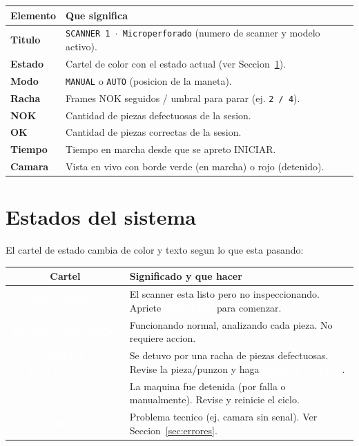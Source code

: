 \documentclass[11pt,a4paper]{article}
\newcommand{\btn}[1]{\colorbox{ink}{\textcolor{white}{\small\,\textbf{#1}\,}}}
\newcommand{\estado}[2]{\colorbox{#1}{\textcolor{white}{\small\,\textbf{#2}\,}}}
\begin{document}
\begin{center}
\renewcommand{\arraystretch}{1.35}
\begin{tabular}{>{\raggedright\arraybackslash}p{4.6cm} p{10.2cm}}
\toprule
\textbf{Elemento} & \textbf{Que significa}\\
\midrule
\textbf{Titulo} & \texttt{SCANNER 1 $\cdot$ Microperforado} (numero de scanner y modelo activo).\\
\textbf{Estado} & Cartel de color con el estado actual (ver Seccion~\ref{sec:estados}).\\
\textbf{Modo} & \texttt{MANUAL} o \texttt{AUTO} (posicion de la maneta).\\
\textbf{Racha} & Frames NOK seguidos / umbral para parar (ej. \texttt{2 / 4}).\\
\textbf{NOK} & Cantidad de piezas defectuosas de la sesion.\\
\textbf{OK} & Cantidad de piezas correctas de la sesion.\\
\textbf{Tiempo} & Tiempo en marcha desde que se apreto INICIAR.\\
\textbf{Camara} & Vista en vivo con borde verde (en marcha) o rojo (detenido).\\
\bottomrule
\end{tabular}
\end{center}

\section{Estados del sistema}\label{sec:estados}
El cartel de estado cambia de color y texto segun lo que esta pasando:

\begin{center}
\renewcommand{\arraystretch}{1.5}
\begin{tabular}{c >{\raggedright\arraybackslash}p{11.5cm}}
\toprule
\textbf{Cartel} & \textbf{Significado y que hacer}\\
\midrule
\estado{idleBlue}{EN ESPERA} & El scanner esta listo pero no inspeccionando.
  Apriete \btn{INICIAR} para comenzar.\\
\estado{okGreen}{INSPECCIONANDO} & Funcionando normal, analizando cada pieza.
  No requiere accion.\\
\estado{warnAmber}{FALLA DETECTADA} & Se detuvo por una racha de piezas
  defectuosas. Revise la pieza/punzon y haga \btn{RESET FALLA}.\\
\estado{nokRed}{DETENIDO} & La maquina fue detenida (por falla o manualmente).
  Revise y reinicie el ciclo.\\
\estado{ink}{ERROR} & Problema tecnico (ej. camara sin senal). Ver
  Seccion~\ref{sec:errores}.\\
\bottomrule
\end{tabular}
\end{center}
\end{document}
